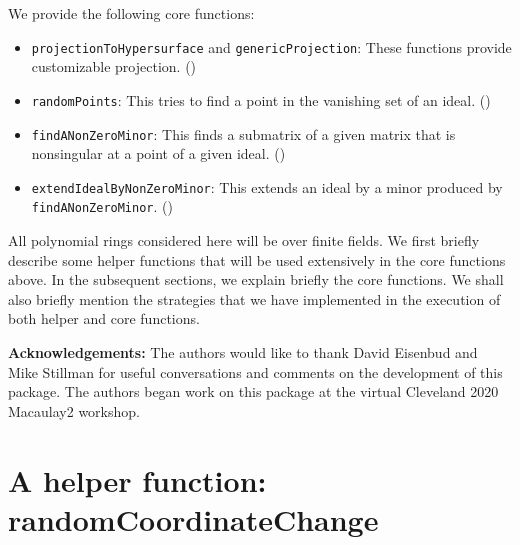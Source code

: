 \documentclass[11pt]{amsart}
\theoremstyle{definition}
\begin{document}
We provide the following core functions:
\begin{itemize}
\item {\tt projectionToHypersurface} and {\tt genericProjection}: These functions provide customizable projection. () 	
\item {\tt randomPoints}:  This tries to find a point in the vanishing set of an ideal. ()
\item {\tt findANonZeroMinor}:  This finds a submatrix of a given matrix that is nonsingular at a point of a given ideal. ()          
\item {\tt extendIdealByNonZeroMinor}:  This extends an ideal by a minor produced by \\{\tt findANonZeroMinor}. ()	
\end{itemize}

All polynomial rings considered here will be over finite fields. We first briefly describe some helper functions that will be used extensively in the core functions above. In the subsequent sections, we explain briefly the core functions. We shall also briefly mention the strategies that we have implemented in the execution of both helper and core functions.

\vspace{1em}
\noindent \textbf{Acknowledgements:} The authors would like to thank David Eisenbud and Mike Stillman for useful conversations and comments on the development of this package.  The authors began work on this package at the virtual Cleveland 2020 Macaulay2 workshop.

\section{A helper function: randomCoordinateChange}{\label{helper}}




\end{document}
